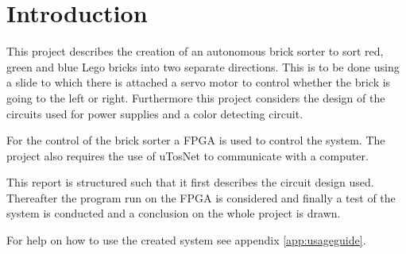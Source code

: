
\section{Introduction}

This project describes the creation of an autonomous brick sorter to sort red, green and blue Lego bricks into two separate directions.
This is to be done using a slide to which there is attached a servo motor to control whether the brick is going to the left or right.
Furthermore this project considers the design of the circuits used for power supplies and   a color detecting circuit.

For the control of the brick sorter a FPGA is used to control the system.
The project also requires the use of uTosNet to communicate with a computer.

This report is structured such that it first describes the circuit design used.
Thereafter the program run on the FPGA is considered and finally a test of the system is conducted and a conclusion on the whole project is drawn.

For help on how to use the created system see appendix \ref{app:usageguide}.



	